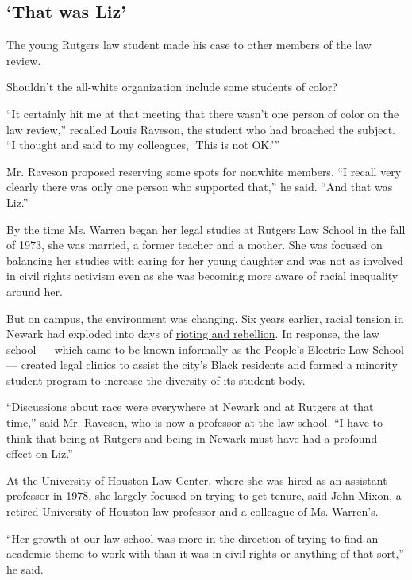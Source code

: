 \hypertarget{that-was-liz}{%
\subsection{`That was Liz'}\label{that-was-liz}}

The young Rutgers law student made his case to other members of the law
review.

Shouldn't the all-white organization include some students of color?

``It certainly hit me at that meeting that there wasn't one person of
color on the law review,'' recalled Louis Raveson, the student who had
broached the subject. ``I thought and said to my colleagues, `This is
not OK.'''

Mr. Raveson proposed reserving some spots for nonwhite members. ``I
recall very clearly there was only one person who supported that,'' he
said. ``And that was Liz.''

By the time Ms. Warren began her legal studies at Rutgers Law School in
the fall of 1973, she was married, a former teacher and a mother. She
was focused on balancing her studies with caring for her young daughter
and was not as involved in civil rights activism even as she was
becoming more aware of racial inequality around her.

But on campus, the environment was changing. Six years earlier, racial
tension in Newark had exploded into days of
\href{https://www.nytimes.com/2017/07/11/nyregion/newark-riots-50-years.html}{rioting
and rebellion}. In response, the law school --- which came to be known
informally as the People's Electric Law School --- created legal clinics
to assist the city's Black residents and formed a minority student
program to increase the diversity of its student body.

``Discussions about race were everywhere at Newark and at Rutgers at
that time,'' said Mr. Raveson, who is now a professor at the law school.
``I have to think that being at Rutgers and being in Newark must have
had a profound effect on Liz.''

At the University of Houston Law Center, where she was hired as an
assistant professor in 1978, she largely focused on trying to get
tenure, said John Mixon, a retired University of Houston law professor
and a colleague of Ms. Warren's.

``Her growth at our law school was more in the direction of trying to
find an academic theme to work with than it was in civil rights or
anything of that sort,'' he said.

